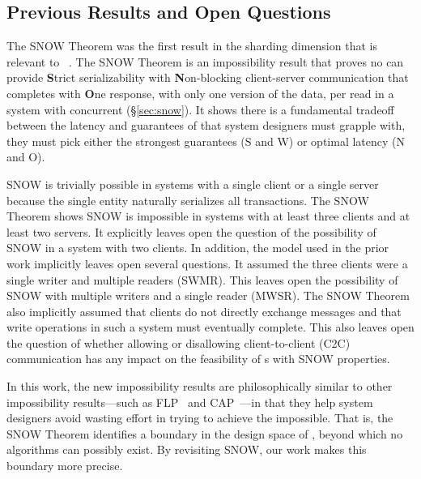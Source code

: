 \subsection{Previous Results and Open Questions}
The SNOW Theorem was the first result in the sharding dimension that is relevant to \rots{}~\cite{SNOW2016}.
The SNOW Theorem is an impossibility result that proves no \rot{} can provide \textbf{S}trict serializability with \textbf{N}on-blocking client-server communication that completes with \textbf{O}ne response, with only one version of the data, per read in a system with concurrent \wotsSNOW{} (\S\ref{sec:snow}).
It shows there is a fundamental tradeoff between the latency and guarantees of \rots{} that system designers must grapple with, they must pick either the strongest guarantees (S and W) or optimal latency (N and O).

SNOW is trivially possible in systems with a single client or a single server because the single entity naturally serializes all transactions.
The SNOW Theorem shows SNOW is impossible in systems with at least three clients and at least two servers.
It explicitly leaves open the question of the possibility of SNOW in a system with two clients.
In addition, the model used in the prior work implicitly leaves open several questions.
It assumed the three clients were a single writer and multiple readers (SWMR).
This leaves open the possibility of SNOW with multiple writers and a single reader (MWSR).
The SNOW Theorem also implicitly assumed that clients do not directly exchange messages and that write operations in such a system must eventually complete.
This also leaves open the question of whether allowing or disallowing client-to-client (C2C) communication has any impact on the feasibility of \rot{}s with SNOW properties.

In this work, the new impossibility results %
are philosophically similar to other impossibility results---such as FLP~\cite{Fischer:pds1983} and CAP~\cite{Brewer:pdc2000, Gilbert:sigact2002}---in that they help system designers avoid wasting effort in trying to achieve the impossible. That is, the SNOW Theorem identifies a boundary in the design space of \rots{}, beyond which no algorithms can possibly exist. By revisiting SNOW, our work makes this boundary more precise.



